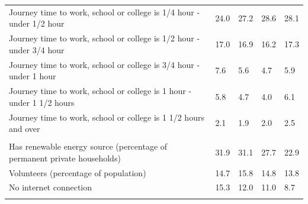 \documentclass{article}
\begin{document}
\begin{table}[h]
\begin{tabular}{KTTTT}
Journey time to work, school or college is 1/4 hour - under 1/2 hour & 24.0& 27.2& 28.6& 28.1\\
Journey time to work, school or college is 1/2 hour - under 3/4 hour & 17.0& 16.9& 16.2& 17.3\\
Journey time to work, school or college is 3/4 hour - under 1 hour & 7.6& 5.6& 4.7& 5.9\\
Journey time to work, school or college is 1 hour - under 1 1/2 hours & 5.8& 4.7& 4.0& 6.1\\
Journey time to work, school or college is 1 1/2 hours and over & 2.1& 1.9& 2.0& 2.5\\
\hline
    \\ 
    \hline
Has renewable energy source (percentage of permanent private households) & 31.9& 31.1& 27.7& 22.9\\
    \hline
Volunteers (percentage of population) & 14.7& 15.8& 14.8& 13.8\\
    \hline
No internet connection& 15.3& 12.0& 11.0&  8.7\\
\hline
\end{tabular}
\end{table}
\end{document}
